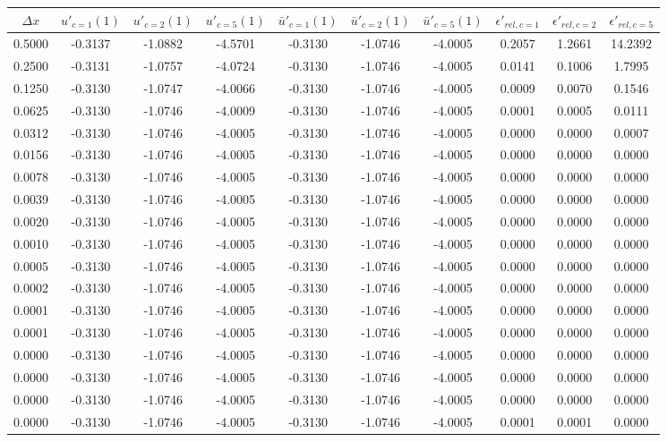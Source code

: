 \begin{tabular}{|c|c|c|c|c|c|c|c|c|c|}
\hline
\textbf{$\Delta x$}&\textbf{$u'_{c=1}(1)$}&\textbf{$u'_{c=2}(1)$}&\textbf{$u'_{c=5}(1)$}&\textbf{$\bar{u}'_{c=1}(1)$}&\textbf{$\bar{u}'_{c=2}(1)$}&\textbf{$\bar{u}'_{c=5}(1)$}&\textbf{$\epsilon'_{rel,c=1}$}&\textbf{$\epsilon'_{rel,c=2}$}&\textbf{$\epsilon'_{rel,c=5}$}\\\hline
0.5000&-0.3137&-1.0882&-4.5701&-0.3130&-1.0746&-4.0005&0.2057&1.2661&14.2392\\\hline
0.2500&-0.3131&-1.0757&-4.0724&-0.3130&-1.0746&-4.0005&0.0141&0.1006&1.7995\\\hline
0.1250&-0.3130&-1.0747&-4.0066&-0.3130&-1.0746&-4.0005&0.0009&0.0070&0.1546\\\hline
0.0625&-0.3130&-1.0746&-4.0009&-0.3130&-1.0746&-4.0005&0.0001&0.0005&0.0111\\\hline
0.0312&-0.3130&-1.0746&-4.0005&-0.3130&-1.0746&-4.0005&0.0000&0.0000&0.0007\\\hline
0.0156&-0.3130&-1.0746&-4.0005&-0.3130&-1.0746&-4.0005&0.0000&0.0000&0.0000\\\hline
0.0078&-0.3130&-1.0746&-4.0005&-0.3130&-1.0746&-4.0005&0.0000&0.0000&0.0000\\\hline
0.0039&-0.3130&-1.0746&-4.0005&-0.3130&-1.0746&-4.0005&0.0000&0.0000&0.0000\\\hline
0.0020&-0.3130&-1.0746&-4.0005&-0.3130&-1.0746&-4.0005&0.0000&0.0000&0.0000\\\hline
0.0010&-0.3130&-1.0746&-4.0005&-0.3130&-1.0746&-4.0005&0.0000&0.0000&0.0000\\\hline
0.0005&-0.3130&-1.0746&-4.0005&-0.3130&-1.0746&-4.0005&0.0000&0.0000&0.0000\\\hline
0.0002&-0.3130&-1.0746&-4.0005&-0.3130&-1.0746&-4.0005&0.0000&0.0000&0.0000\\\hline
0.0001&-0.3130&-1.0746&-4.0005&-0.3130&-1.0746&-4.0005&0.0000&0.0000&0.0000\\\hline
0.0001&-0.3130&-1.0746&-4.0005&-0.3130&-1.0746&-4.0005&0.0000&0.0000&0.0000\\\hline
0.0000&-0.3130&-1.0746&-4.0005&-0.3130&-1.0746&-4.0005&0.0000&0.0000&0.0000\\\hline
0.0000&-0.3130&-1.0746&-4.0005&-0.3130&-1.0746&-4.0005&0.0000&0.0000&0.0000\\\hline
0.0000&-0.3130&-1.0746&-4.0005&-0.3130&-1.0746&-4.0005&0.0000&0.0000&0.0000\\\hline
0.0000&-0.3130&-1.0746&-4.0005&-0.3130&-1.0746&-4.0005&0.0001&0.0001&0.0000\\\hline
\end{tabular}
